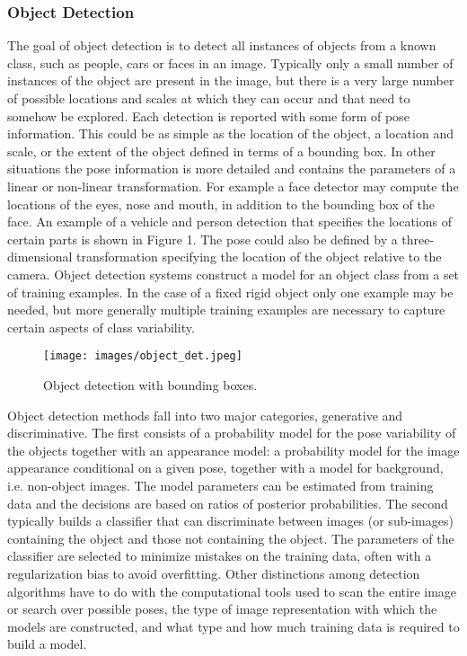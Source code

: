 \documentclass{article}
\begin{document}
\subsubsection{Object Detection}
 The goal of object detection is to detect all instances of objects from a known
class, such as people, cars or faces in an image. Typically only a small number
of instances of the object are present in the image, but there is a very large
number of possible locations and scales at which they can occur and that need
to somehow be explored.
Each detection is reported with some form of pose information. This could
be as simple as the location of the object, a location and scale, or the extent
of the object defined in terms of a bounding box. In other situations the pose
information is more detailed and contains the parameters of a linear or non-linear
transformation. For example a face detector may compute the locations of the
eyes, nose and mouth, in addition to the bounding box of the face. An example
of a vehicle and person detection that specifies the locations of certain parts is shown in
Figure 1. The pose could also be defined by a three-dimensional transformation
specifying the location of the object relative to the camera.
Object detection systems construct a model for an object class from a set of
training examples. In the case of a fixed rigid object only one example may be
needed, but more generally multiple training examples are necessary to capture
certain aspects of class variability.
\begin{figure}[H]
  \centering
  \texttt{[image: images/object\_det.jpeg]}
   \caption{Object detection with bounding boxes.}
\end{figure}

Object detection methods fall into two major categories, generative and discriminative. The first consists of a probability model for the pose variability of the objects together with an appearance model: a probability model for the image appearance conditional on a given pose, together with a model for background, i.e. non-object images. The model parameters can be estimated from training data and the decisions are based on ratios of posterior probabilities. The second typically builds a classifier that can discriminate between images (or sub-images) containing the object and those not containing the object. The parameters of the classifier are selected to minimize mistakes on the training data, often with a regularization bias to avoid overfitting. Other distinctions among detection algorithms have to do with the computational tools used to scan the entire image or search over possible poses, the type of image representation with which the models are constructed, and what type and how much training data is required to build a model.	
\end{document}
